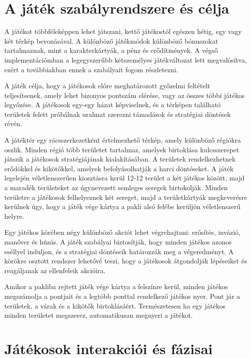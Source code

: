 \documentclass[
]{thesis-ekf}
\theoremstyle{definition}
\theoremstyle{remark}
\begin{document}
	\section{A játék szabályrendszere és célja}
	
	A játékot többféleképpen lehet játszani, kettő játékostól egészen hétig, egy vagy két térkép bevonásával. A különböző játékmódok különböző bónuszokat tartalmaznak, mint a karakterkártyák, a pénz és erődítmények. A végső implementációmban a legegyszerűbb kétszemélyes játékváltozat lett megvalósítva, ezért a továbbiakban ennek a szabályait fogom részletezni. 
	
	A játék célja, hogy a játékosok előre meghatározott győzelmi feltételt teljesítsenek, amely lehet bizonyos pontszám elérése, vagy az összes többi játékos legyőzése. A játékosok egy-egy házat képviselnek, és a térképen található területek felett próbálnak uralmat szerezni támadások és stratégiai döntések révén. 
	
	A játéktér egy rácsszerkezetként értelmezhető térkép, amely különböző régiókra oszlik. Minden régió több területet tartalmaz, amelyek birtoklása kulcsszerepet játszik a játékosok stratégiájának kialakításában. A területek rendelkezhetnek erődökkel és kikötőkkel, amelyek befolyásolhatják a harci döntéseket. A játék legelején véletlenszerűen kiosztásra kerül 12-12 terület a két játékos között, majd a maradék területeket az úgynevezett semleges seregek birtokolják. Minden területre a játékosok felhelyeznek két sereget, majd a területkártyák megkeverésre kerülnek úgy, hogy a játék vége kártya a pakli alsó felébe kerüljön véletlenszerű helyre.
	
	Egy játékos körében négy különböző akciót lehet végrehajtani: erősítés, invázió, manőver és húzás. A játék szabályai biztosítják, hogy minden játékos azonos eséllyel induljon, és a stratégiai döntéseik határozzák meg a végeredményt. A körökre osztott rendszer lehetővé teszi, hogy a játékosok átgondolják lépéseiket és reagáljanak az ellenfeleik akcióira.
	
	Amikor a pakliba rejtett játék vége kártya a felszínre kerül, minden játékos megszámolja a pontjait és a legtöbb ponttal rendelkező játékos nyer. Pont jár a területek, a várak és a kikötők birtoklásáért. Természetesen ha egy játékos minden területet megszerez, automatikusan megnyeri a játékot.
	
	\section{Játékosok interakciói és fázisai}
	
\end{document}
